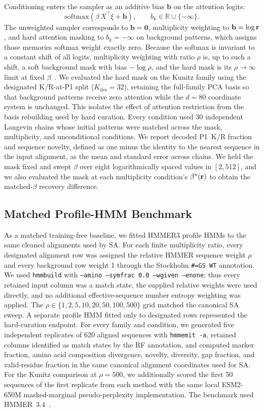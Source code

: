 Conditioning enters the sampler as an additive bias $\mathbf{b}$ on the attention logits:
\[
\mathrm{softmax}(\beta\,X^{\top}\xi + \mathbf{b}),
\qquad b_k \in \mathbb{R} \cup \{-\infty\}.
\]
The unweighted sampler corresponds to $\mathbf{b} = \mathbf{0}$, multiplicity weighting to
$\mathbf{b} = \log\mathbf{r}$, and hard attention masking to $b_k = -\infty$ on background patterns,
which assigns those memories softmax weight exactly zero. Because the softmax is invariant to a
constant shift of all logits, multiplicity weighting with ratio $\rho$ is, up to such a shift, a
soft background mask with bias $-\log\rho$, and the hard mask is its $\rho \to \infty$ limit at
fixed $\beta$~\cite{varnerSAProtein2026}. We evaluated the hard mask on the Kunitz family using
the designated K/R-at-P1 split ($K_{\mathrm{des}} = 32$), retaining the full-family PCA basis so
that background patterns receive zero attention while the $d = 80$ coordinate system is unchanged.
This isolates the effect of attention restriction from the basis rebuilding used by hard
curation. Every condition used 30 independent Langevin chains whose initial patterns were
matched across the mask, multiplicity, and unconditional conditions. We report decoded P1~K/R
fraction and sequence novelty, defined as one minus the identity to the nearest sequence in the
input alignment, as the mean and standard error across chains. We held the mask fixed and swept
$\beta$ over eight logarithmically spaced values in $[2,512]$, and we also evaluated the mask at
each multiplicity condition's $\beta^{*}(\mathbf{r})$ to obtain the matched-$\beta$ recovery difference.

\subsection{Matched Profile-HMM Benchmark}

As a matched training-free baseline, we fitted HMMER3 profile HMMs to the same cleaned
alignments used by SA. For each finite multiplicity ratio, every designated alignment row was
assigned the relative HMMER sequence weight $\rho$ and every background row weight 1 through
the Stockholm \texttt{\#=GS WT} annotation. We used \texttt{hmmbuild} with
\texttt{--amino --symfrac 0.0 --wgiven --enone}; thus every retained input column was a match
state, the supplied relative weights were used directly, and no additional effective-sequence
number entropy weighting was applied. The $\rho\in\{1,2,5,10,20,50,100,500\}$ grid matched
the canonical SA sweep. A separate profile HMM fitted only to designated rows represented the
hard-curation endpoint. For every family and condition, we generated five independent
replicates of 620 aligned sequences with \texttt{hmmemit -a}, retained columns identified as
match states by the RF annotation, and computed marker fraction, amino acid composition
divergence, novelty, diversity, gap fraction, and valid-residue fraction in the same canonical
alignment coordinates used for SA. For the Kunitz comparison at $\rho=500$, we additionally
scored the first 50 sequences of the first replicate from each method with the same local
ESM2-650M masked-marginal pseudo-perplexity implementation. The benchmark used
HMMER~3.4~\cite{hmmer3}.


